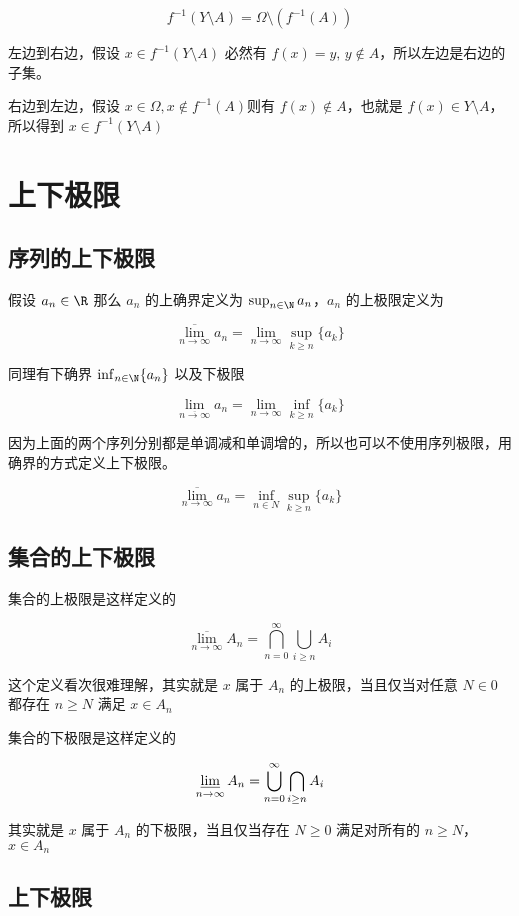 \[
f^{-1}(Y \setminus A) = \Omega \setminus (f^{-1}(A))
\]

左边到右边，假设 $x \in f^{-1}(Y \setminus A)$ 必然有 $f(x) = y,\, y \notin A$，所以左边是右边的子集。

右边到左边，假设 $x \in \Omega, x \notin f^{-1}(A) $则有 $f(x) \notin A$，也就是 $f(x) \in Y \setminus A$，所以得到 $x \in f^{-1}(Y \setminus A)$

\section{上下极限}


\subsection{序列的上下极限}

假设 $a_n \in \R$ 那么 $a_n$ 的上确界定义为 $\sup_{n \in \N} a_n$，$a_n$ 的上极限定义为

\[
\overline{\lim_{n \to \infty}}a_n = \lim_{n \to \infty} \sup_{k \ge n} \{ a_k \}
\]

同理有下确界 $\inf_{n \in \N} \{ a_n \}$ 以及下极限

\[
\lim_{\overline{n \to \infty}}a_n = \lim_{n \to \infty} \inf_{k \ge n} \{ a_k  \}
\]

因为上面的两个序列分别都是单调减和单调增的，所以也可以不使用序列极限，用确界的方式定义上下极限。

\[
\overline{\lim_{n \to \infty}}a_n = \inf_{n \in N} \sup_{k \ge n} \{ a_k \}
\]


\subsection{集合的上下极限}

集合的上极限是这样定义的

\[
\overline{\lim_{n \to \infty}}A_n  = \bigcap_{n=0}^{\infty}\bigcup_{i \ge n}A_i
\]

这个定义看次很难理解，其实就是 $x$ 属于 $A_n$ 的上极限，当且仅当对任意 $N \in 0$ 都存在 $n \ge N$ 满足 $x \in A_n$


集合的下极限是这样定义的

\[
\varliminf_{n \to \infty}A_n  = \bigcup_{n=0}^{\infty}\bigcap_{i \ge n}A_i
\]

其实就是 $x$ 属于 $A_n$ 的下极限，当且仅当存在 $N  \ge 0$ 满足对所有的 $n \ge N$，$x \in A_n$

\subsection{上下极限}

